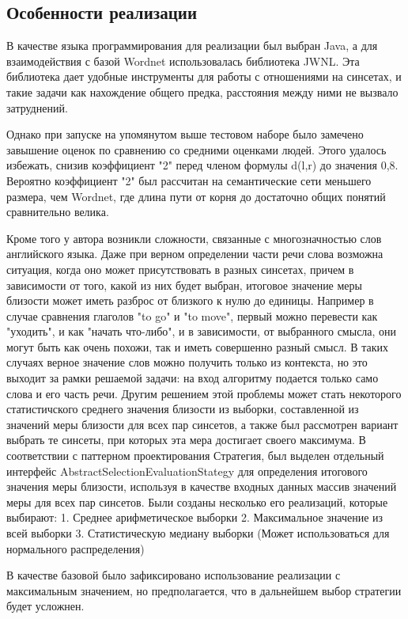 \subsection{Особенности реализации}
В качестве языка программирования для реализации был выбран Java,
а для взаимодействия с базой Wordnet использовалась библиотека JWNL\cite{jwnl}.
Эта библиотека дает удобные инструменты для работы с отношениями на синсетах,
и такие задачи как нахождение общего предка, расстояния между ними не
вызвало затруднений.

Однако при запуске на упомянутом выше тестовом наборе было замечено
завышение оценок
по сравнению со средними оценками людей.
Этого удалось избежать, снизив коэффициент "2" перед членом формулы d(l,r)
до значения 0,8. Вероятно коэффициент "2" был рассчитан на
семантические сети меньшего
размера, чем Wordnet, где длина пути от корня до достаточно общих
понятий сравнительно велика.

Кроме того у  автора возникли сложности, связанные с многозначностью
слов английского языка.
Даже при верном определении части речи слова возможна ситуация, когда
оно может присутствовать
в разных синсетах, причем в зависимости от того, какой из них будет выбран,
итоговое значение меры близости может иметь разброс от близкого к нулю
до единицы.
Например в случае сравнения глаголов "to go" и "to move",  первый
можно перевести как "уходить",
и как "начать что-либо", и в зависимости, от выбранного смысла, они
могут быть как очень похожи,
так и иметь совершенно разный смысл.
В таких случаях верное значение слов можно получить только из
контекста, но это выходит
за рамки решаемой задачи: на вход алгоритму подается только само слова
и его часть речи.
Другим решением этой проблемы может стать некоторого статистичского
среднего значения близости из выборки, составленной из значений меры
близости для всех пар синсетов,
а также был рассмотрен вариант выбрать те синсеты, при которых
эта мера достигает своего максимума.
В соответствии с паттерном проектирования Стратегия, был выделен
отдельный интерфейс
AbstractSelectionEvaluationStategy для определения итогового значения
меры близости, используя
в качестве входных данных массив значений меры для всех пар синсетов.
Были созданы несколько его реализаций, которые выбирают:
1. Среднее арифметическое выборки
2. Максимальное значение из всей выборки
3. Статистическую медиану выборки (Может использоваться для
нормального распределения)

В качестве базовой было зафиксировано использование реализации с
максимальным значением,
но предполагается, что в дальнейшем выбор стратегии будет усложнен.

